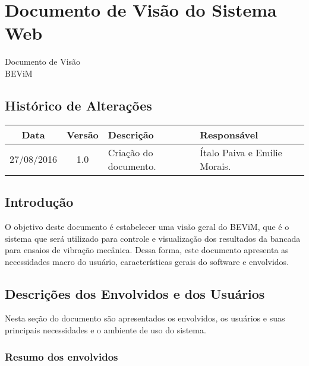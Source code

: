 \chapter{Documento de Visão do Sistema Web} \label{documento_visao}
% 	


\begin{center}
 {\large Documento de Visão}\\[0.2cm]
 {BEViM}\\
 \end{center}
 
 \section*{Histórico de Alterações}
\begin{table}[h]
\centering
\begin{tabular}{|c|c|p{6cm}|p{5cm}|}
\hline
Data & Versão & Descrição & Responsável\\
\hline                               
27/08/2016 & 1.0 & Criação do documento. & Ítalo Paiva e Emilie Morais.\\
\hline
\end{tabular}
\end{table}

\section*{Introdução}
	
    O objetivo deste documento é estabelecer uma visão geral do BEViM, que é o sistema que será utilizado para controle e visualização dos resultados da bancada para ensaios de vibração mecânica. Dessa forma, este documento apresenta as necessidades macro do usuário, características gerais do software e envolvidos.
    
   
\section*{Descrições dos Envolvidos e dos Usuários}
	
    Nesta seção do documento são apresentados os envolvidos, os usuários e suas principais necessidades e o ambiente de uso do sistema.
    \subsection*{Resumo dos envolvidos}
		
